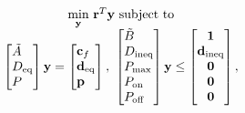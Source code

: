 \begin{equation}\label{eqn:finalObjective}
	\begin{matrix*}[c]
		\underset{\mathbf{y}}{\scalebox{1}{\text{min}}} \ \mathbf{r}^T\mathbf{y} \ \text{subject to}\\
		\begin{bmatrix*}[l]
				\tilde{A} \\
				D_{\text{eq}} \\
				P
				\end{bmatrix*} \mathbf{y} = \begin{bmatrix*}[l]\mathbf{c}_f \\ \mathbf{d}_{\text{eq}}\\\mathbf{p} \end{bmatrix*}, \ \begin{bmatrix*}[l]
			\tilde{B} \\
			D_{\text{ineq}} \\ 
			P_{\text{max}} \\
			P_{\text{on}} \\
			P_{\text{off}}
			\end{bmatrix*}\mathbf{y} \le \begin{bmatrix*}\mathbf{1} \\ \mathbf{d}_{\text{ineq}} \\ \mathbf{0} \\ \mathbf{0} \\ \mathbf{0} \end{bmatrix*},
	\end{matrix*}
\end{equation}


